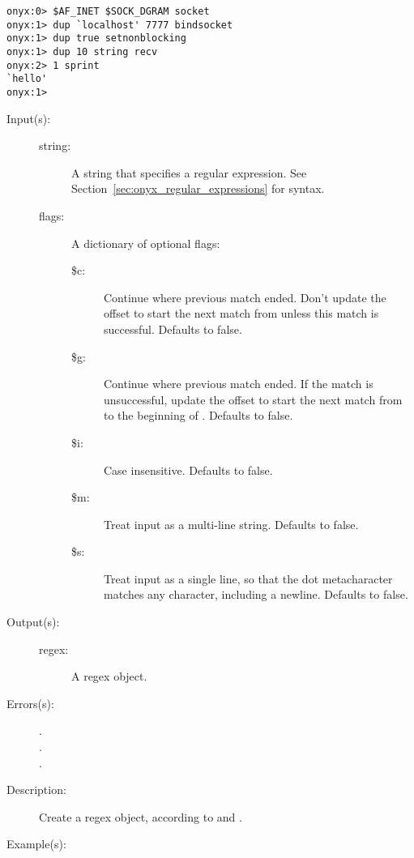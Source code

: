 \begin{description}
\begin{description}
\begin{verbatim}
onyx:0> $AF_INET $SOCK_DGRAM socket
onyx:1> dup `localhost' 7777 bindsocket
onyx:1> dup true setnonblocking
onyx:1> dup 10 string recv
onyx:2> 1 sprint
`hello'
onyx:1>
		\end{verbatim}
	\end{description}
\label{systemdict:regex}
\item[{\onyxop{string flags}{regex}{regex}}: ]
\item[{\onyxop{string}{regex}{regex}}: ]
	\begin{description}\item[]
	\item[Input(s): ]
		\begin{description}\item[]
		\item[string: ]
			A string that specifies a regular expression.  See
			Section~\ref{sec:onyx_regular_expressions} for syntax.
		\item[flags: ]
			A dictionary of optional flags:
			\begin{description}%
			\item[\$c: ]
				Continue where previous match ended.  Don't
				update the offset to start the next match from
				unless this match is successful.  Defaults to
				false.
			\item[\$g: ]
				Continue where previous match ended.  If the
				match is unsuccessful, update the offset to
				start the next match from to the beginning of
				.  Defaults to false.
			\item[\$i: ] Case insensitive.  Defaults to false.
			\item[\$m: ] Treat input as a multi-line string.
				Defaults to false.
			\item[\$s: ] Treat input as a single line, so that
				the dot metacharacter matches any character,
				including a newline.  Defaults to false.
			\end{description}
		\end{description}
	\item[Output(s): ]
		\begin{description}\item[]
		\item[regex: ]
			A regex object.
		\end{description}
	\item[Errors(s): ]
		\begin{description}\item[]
		\item[.]
		\item[.]
		\item[.]
		\end{description}
	\item[Description: ]
		Create a regex object, according to  and
		.
	\item[Example(s): ]\begin{verbatim}


\end{verbatim}
\end{description}
\end{description}
